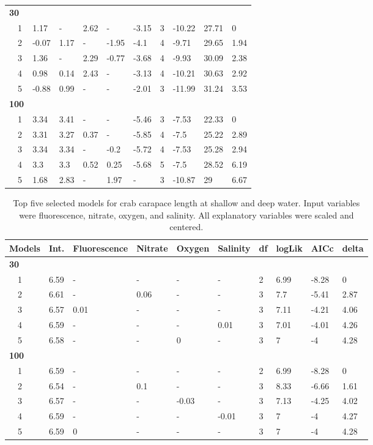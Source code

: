 \documentclass[letterpaper,12pt]{article}\usepackage[]{graphicx}\usepackage[]{color}
\begin{document}
\begin{landscape}
\begin{table}[!tbp]
{\begin{center}
\begin{tabular}{llllllllll}
\hline
{\bfseries 30}&&&&&&&&&\tabularnewline
~~1&1.17&-&2.62&-&-3.15&3&-10.22&27.71&0\tabularnewline
~~2&-0.07&1.17&-&-1.95&-4.1&4&-9.71&29.65&1.94\tabularnewline
~~3&1.36&-&2.29&-0.77&-3.68&4&-9.93&30.09&2.38\tabularnewline
~~4&0.98&0.14&2.43&-&-3.13&4&-10.21&30.63&2.92\tabularnewline
~~5&-0.88&0.99&-&-&-2.01&3&-11.99&31.24&3.53\tabularnewline
\hline
{\bfseries 100}&&&&&&&&&\tabularnewline
~~1&3.34&3.41&-&-&-5.46&3&-7.53&22.33&0\tabularnewline
~~2&3.31&3.27&0.37&-&-5.85&4&-7.5&25.22&2.89\tabularnewline
~~3&3.34&3.34&-&-0.2&-5.72&4&-7.53&25.28&2.94\tabularnewline
~~4&3.3&3.3&0.52&0.25&-5.68&5&-7.5&28.52&6.19\tabularnewline
~~5&1.68&2.83&-&1.97&-&3&-10.87&29&6.67\tabularnewline
\hline
\end{tabular}\end{center}}
\end{table}

\end{landscape}

\begin{landscape}
\centering\vspace*{\fill}
\begin{table}[!tbp]
{\scriptsize
\caption{Top five selected models for crab carapace length at shallow and deep water. Input variables were fluorescence, nitrate, oxygen, and salinity.  All explanatory variables were scaled and centered.\label{tab:cltab}} 
\begin{center}
\begin{tabular}{llllllllll}
\hline\hline
\multicolumn{1}{l}{Models}&\multicolumn{1}{c}{Int.}&\multicolumn{1}{c}{Fluorescence}&\multicolumn{1}{c}{Nitrate}&\multicolumn{1}{c}{Oxygen}&\multicolumn{1}{c}{Salinity}&\multicolumn{1}{c}{df}&\multicolumn{1}{c}{logLik}&\multicolumn{1}{c}{AICc}&\multicolumn{1}{c}{delta}\tabularnewline
\hline
{\bfseries 30}&&&&&&&&&\tabularnewline
~~1&6.59&-&-&-&-&2&6.99&-8.28&0\tabularnewline
~~2&6.61&-&0.06&-&-&3&7.7&-5.41&2.87\tabularnewline
~~3&6.57&0.01&-&-&-&3&7.11&-4.21&4.06\tabularnewline
~~4&6.59&-&-&-&0.01&3&7.01&-4.01&4.26\tabularnewline
~~5&6.58&-&-&0&-&3&7&-4&4.28\tabularnewline
\hline
{\bfseries 100}&&&&&&&&&\tabularnewline
~~1&6.59&-&-&-&-&2&6.99&-8.28&0\tabularnewline
~~2&6.54&-&0.1&-&-&3&8.33&-6.66&1.61\tabularnewline
~~3&6.57&-&-&-0.03&-&3&7.13&-4.25&4.02\tabularnewline
~~4&6.59&-&-&-&-0.01&3&7&-4&4.27\tabularnewline
~~5&6.59&0&-&-&-&3&7&-4&4.28\tabularnewline
\hline
\end{tabular}\end{center}}
\end{table}

\end{landscape}
\end{document}
